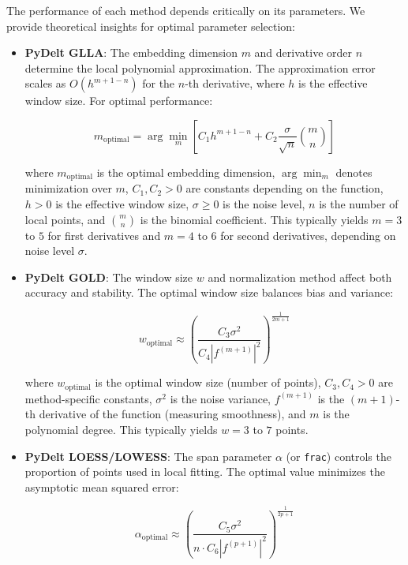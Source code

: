 \documentclass[10pt,journal,compsoc]{IEEEtran}
\begin{document}
The performance of each method depends critically on its parameters. We provide theoretical insights for optimal parameter selection:

\begin{itemize}
    \item \textbf{PyDelt GLLA}: The embedding dimension $m$ and derivative order $n$ determine the local polynomial approximation. The approximation error scales as $O(h^{m+1-n})$ for the $n$-th derivative, where $h$ is the effective window size. For optimal performance:
    
    \begin{equation}
        m_{\text{optimal}} = \arg\min_m \left[ C_1 h^{m+1-n} + C_2 \frac{\sigma}{\sqrt{n}} \binom{m}{n} \right]
    \end{equation}
    
    where $m_{\text{optimal}}$ is the optimal embedding dimension, $\arg\min_m$ denotes minimization over $m$, $C_1, C_2 > 0$ are constants depending on the function, $h > 0$ is the effective window size, $\sigma \geq 0$ is the noise level, $n$ is the number of local points, and $\binom{m}{n}$ is the binomial coefficient. This typically yields $m = 3$ to $5$ for first derivatives and $m = 4$ to $6$ for second derivatives, depending on noise level $\sigma$.
    
    \item \textbf{PyDelt GOLD}: The window size $w$ and normalization method affect both accuracy and stability. The optimal window size balances bias and variance:
    
    \begin{equation}
        w_{\text{optimal}} \approx \left( \frac{C_3 \sigma^2}{C_4 |f^{(m+1)}|^2} \right)^{\frac{1}{2m+1}}
    \end{equation}
    
    where $w_{\text{optimal}}$ is the optimal window size (number of points), $C_3, C_4 > 0$ are method-specific constants, $\sigma^2$ is the noise variance, $f^{(m+1)}$ is the $(m+1)$-th derivative of the function (measuring smoothness), and $m$ is the polynomial degree. This typically yields $w = 3$ to $7$ points.
    
    \item \textbf{PyDelt LOESS/LOWESS}: The span parameter $\alpha$ (or \texttt{frac}) controls the proportion of points used in local fitting. The optimal value minimizes the asymptotic mean squared error:
    
    \begin{equation}
        \alpha_{\text{optimal}} \approx \left( \frac{C_5 \sigma^2}{n \cdot C_6 |f^{(p+1)}|^2} \right)^{\frac{1}{2p+1}}
    \end{equation}
    

\end{itemize}
\end{document}

